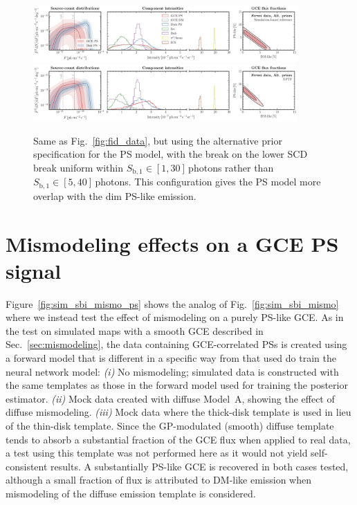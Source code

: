 \documentclass[prd,aps,10pt,nofootinbib,twocolumn,superscriptaddress,preprintnumbers,balancelastpage,longbibliography,floatfix]{revtex4-2}
\begin{document}
%
\begin{figure}[!t]
\centering
\includegraphics[width=0.9\textwidth]{plots/data_fid_sbi_new_ps_priors.pdf}
\includegraphics[width=0.9\textwidth]{plots/data_fid_nptf_new_ps_priors.pdf}
\caption{Same as Fig.~\ref{fig:fid_data}, but using the alternative prior specification for the PS model, with the break on the lower SCD break uniform within $S_{\mathrm{b}, 1}  \in  [1, 30]$\,photons rather than $S_{\mathrm{b}, 1}  \in  [5, 40]$\,photons. This configuration gives the PS model more overlap with the dim PS-like emission.}
\label{fig:fid_data_alt_priors}
\end{figure}
%

\section{Mismodeling effects on a GCE PS signal}
\label{app:mismodeling_ps}

Figure~\ref{fig:sim_sbi_mismo_ps} shows the analog of Fig.~\ref{fig:sim_sbi_mismo} where we instead test the effect of mismodeling on a purely PS-like GCE. As in the test on simulated maps with a smooth GCE described in Sec.~\ref{sec:mismodeling}, the data containing GCE-correlated PSs is created using a forward model that is different in a specific way from that used do train the neural network model: \emph{(i)} No mismodeling; simulated data is constructed with the same templates as those in the forward model used for training the posterior estimator. \emph{(ii)} Mock data created with diffuse {Model~A}, showing the effect of diffuse mismodeling. \emph{(iii)} Mock data where the thick-disk template is used in lieu of the thin-disk template. Since the GP-modulated (smooth) diffuse template tends to absorb a substantial fraction of the GCE flux when applied to real data, a test using this template was not performed here as it would not yield self-consistent results. A substantially PS-like GCE is recovered in both cases tested, although a small fraction of flux is attributed to DM-like emission when mismodeling of the diffuse emission template is considered.
\end{document}
